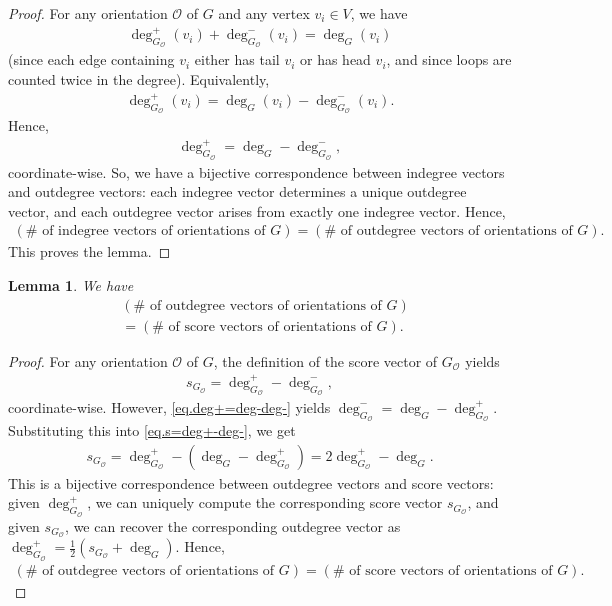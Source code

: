 \documentclass[12pt]{article}
\newtheorem{lemma}[theorem]{Lemma}
\theoremstyle{definition}
\theoremstyle{remark}
\newcommand{\tup}[1]{\left( #1 \right)}
\begin{document}
\begin{proof}
    For any orientation $\mathcal{O}$ of $G$ and any vertex $v_i \in V$, we have \begin{align*}
        \deg_{G_\mathcal{O}}^+(v_i) + \deg_{G_{\mathcal{O}}}^-(v_i) = \deg_G(v_i)
    \end{align*} (since each edge containing $v_i$ either has tail $v_i$ or has head $v_i$, and since loops are counted twice in the degree).
	Equivalently, \begin{align*}
        \deg_{G_\mathcal{O}}^+(v_i) = \deg_G(v_i) - \deg_{G_{\mathcal{O}}}^-(v_i).
    \end{align*} Hence, \begin{align}
        \deg_{G_{\mathcal{O}}}^+ = \deg_{G}-\deg_{G_{\mathcal{O}}}^-
		\label{eq.deg+=deg-deg-},
    \end{align} coordinate-wise. So, we have a bijective correspondence between indegree vectors and outdegree vectors: each indegree vector determines a unique outdegree vector, and each outdegree vector arises from exactly one indegree vector. Hence, \begin{align*}
        (\# \text{ of indegree vectors of orientations of $G$}) = (\# \text{ of outdegree vectors of orientations of $G$}).
    \end{align*} This proves the lemma. 
\end{proof}

\begin{lemma}\label{lem:3=4}
    We have
    \begin{align*}
    & (\#\text{ of outdegree vectors of orientations of $G$}) \\
    &= (\#\text{  of score vectors of orientations of $G$}).
    \end{align*}
\end{lemma}

\begin{proof}
    For any orientation $\mathcal{O}$ of $G$,  the definition of the score vector of $G_\mathcal{O}$ yields \begin{align}
        s_{G_\mathcal{O}} = \deg_{G_\mathcal{O}}^+-\deg_{G_\mathcal{O}}^-,
		\label{eq.s=deg+-deg-}
    \end{align} coordinate-wise. However, \eqref{eq.deg+=deg-deg-} yields $\deg_{G_\mathcal{O}}^- = \deg_G - \deg_{G_\mathcal{O}}^+$. Substituting this into \eqref{eq.s=deg+-deg-}, we get \begin{align*}
        s_{G_\mathcal{O}} = \deg_{G_\mathcal{O}}^+-\tup{\deg_G - \deg_{G_\mathcal{O}}^+}
		= 2\deg_{G_\mathcal{O}}^+-\deg_G.
    \end{align*} This is a bijective correspondence between outdegree vectors and score vectors: given $\deg_{G_\mathcal{O}}^+$, we can uniquely compute the corresponding score vector $s_{G_\mathcal{O}}$, and given $s_{G_\mathcal{O}}$, we can recover the corresponding outdegree vector as $\deg_{G_\mathcal{O}}^+ = \frac{1}{2}(s_{G_\mathcal{O}}+\deg_G)$. Hence, \begin{align*}
        (\# \text{ of outdegree vectors of orientations of $G$}) = (\# \text{ of score vectors of orientations of $G$}).\tag*{\qedhere}
    \end{align*}
\end{proof}
\end{document}
